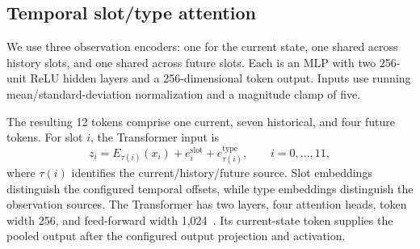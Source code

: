 \subsection{Temporal slot/type attention}\label{sec:architecture}

We use three observation encoders: one for the current state, one shared
across history slots, and one shared across future slots. Each is an MLP
with two 256-unit ReLU hidden layers and a 256-dimensional token output.
Inputs use running mean/standard-deviation normalization and a magnitude
clamp of five.

The resulting 12 tokens comprise one current, seven historical, and four
future tokens. For slot $i$, the Transformer input is
\begin{equation}
    z_i = E_{\tau(i)}(x_i)
        + e_i^{\mathrm{slot}} + e_{\tau(i)}^{\mathrm{type}},
    \qquad i=0,\ldots,11,
    \label{eq:token_embedding}
\end{equation}
where $\tau(i)$ identifies the current/history/future source.
Slot embeddings distinguish the configured temporal offsets, while type
embeddings distinguish the observation sources. The Transformer has two
layers, four attention heads, token width 256, and feed-forward width
1,024~\cite{attention}. Its current-state token supplies the pooled output
after the configured output projection and activation.

